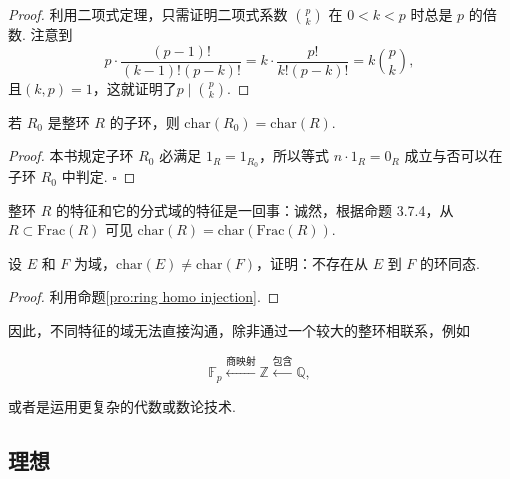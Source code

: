 \documentclass[12pt, a4paper]{ctexart}
\begin{document}
\begin{proof}
	利用二项式定理，只需证明二项式系数 $ \binom{p}{k} $ 在 $ 0 < k < p $ 时总是 $ p $ 的倍数. 注意到\[p\cdot\frac{(p-1)!}{(k-1)!(p-k)!}=k\cdot\frac{p!}{k!(p-k)!}=k\binom{p}{k},\]且$(k,p)=1$，这就证明了$p\mid\binom{p}{k}.$
\end{proof}
\begin{proposition}{}{}
	若 $ R_0 $ 是整环 $ R $ 的子环，则 $ \text{char}(R_0) = \text{char}(R) $. 
\end{proposition}
\begin{proof}
	本书规定子环 $ R_0 $ 必满足 $ 1_R = 1_{R_0} $，所以等式 $ n \cdot 1_R = 0_R $ 成立与否可以在子环 $ R_0 $ 中判定. $\square$
\end{proof}

整环 $ R $ 的特征和它的分式域的特征是一回事：诚然，根据命题 3.7.4，从 $ R \subset \text{Frac}(R) $ 可见 $ \text{char}(R) = \text{char}(\text{Frac}(R)) $. 
\begin{proposition}{}{}
	设 $ E $ 和 $ F $ 为域，$ \text{char}(E) \neq \text{char}(F) $，证明：不存在从 $ E $ 到 $ F $ 的环同态. 
\end{proposition}
\begin{proof}
	利用命题\ref{pro:ring homo injection}. 
\end{proof}
因此，不同特征的域无法直接沟通，除非通过一个较大的整环相联系，例如

\[ \mathbb{F}_p \xleftarrow{\text{商映射}} \mathbb{Z} \xleftarrow{\text{包含}} \mathbb{Q}, \]

或者是运用更复杂的代数或数论技术. 
\subsection{理想}
\end{document}
